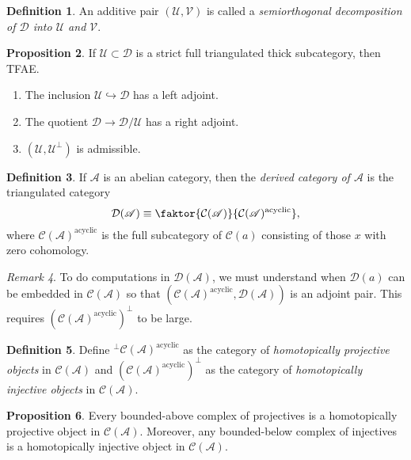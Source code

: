 \documentclass[10pt,letterpaper,cm]{nupset}
\theoremstyle{definition}
\newtheorem{definition}{Definition}[subsection]
\theoremstyle{theorem}
\newtheorem{prop}[definition]{Proposition}
\theoremstyle{remark}
\newtheorem{remark}[definition]{Remark}
\newcommand{\D}{\mathcal{D}}
\newcommand{\1}{\mathbf{1}}
\renewcommand{\a}{\mathscr{A}}
\renewcommand{\d}{\mathscr{D}}
\renewcommand{\u}{\mathscr{U}}
\renewcommand{\v}{\mathscr{V}}
\newcommand{\0}{\vec 0}
\DeclareMathOperator{\acyc}{acyclic}
\begin{document}
\begin{definition}
An additive pair $(\u, \v)$ is called a \textit{semiorthogonal decomposition of $\d$ into $\u$ and $\v$}.
\end{definition}

\begin{prop}
If $\u \subset \d$ is a strict full triangulated thick subcategory, then TFAE.
\begin{enumerate}
\item The inclusion $\u \hookrightarrow \d$ has a left adjoint.
\item The quotient $\d \to \d/\u$ has a right adjoint.
\item $(\u, \u^{\perp})$ is admissible. 
\end{enumerate}
\end{prop}

\begin{definition}
If $\a$ is an abelian category, then the \textit{derived category of $\a$} is the triangulated category $$ \D(\a) \equiv \faktor{\mathcal{C}(\a)}{\mathcal{C}(\a)^{\acyc}}  , $$ where $\mathcal{C}(\a)^{\acyc}$ is the full subcategory of $\mathcal{C}(a)$ consisting of those $x$ with zero cohomology. 
\end{definition}

\begin{remark}
To do computations in $\D(\a)$, we must understand when $\D(a)$ can be embedded in $\mathcal{C}(\a)$ so that $(\mathcal{C}(\a)^{\acyc}, \D(\a))$ is an adjoint pair. This requires $(\mathcal{C}(\a)^{\acyc})^{\perp}$  to be large. 
\end{remark}

\begin{definition}
Define ${^{\perp}{\mathcal{C}(\a)^{\acyc}}}$ as the category of \textit{homotopically projective objects} in $\mathcal{C}(\a)$ and $(\mathcal{C}(\a)^{\acyc})^{\perp}$ as the category of \textit{homotopically injective objects} in $\mathcal{C}(\a)$. 
\end{definition}

\begin{prop}
Every bounded-above complex of projectives is a homotopically projective object in $\mathcal{C}(\a)$. Moreover, any bounded-below complex of injectives is a homotopically injective object in $\mathcal{C}(\a)$. 
\end{prop}
\end{document}
